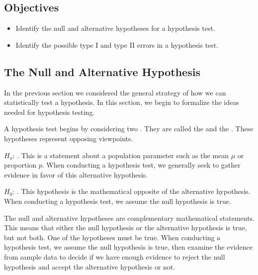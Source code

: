 \documentclass[letterpaper,10pt,english]{jupyterBook}
\begin{document}
\subsection{Objectives}
\label{\detokenize{Ch6 An Introduction to Hypothesis Testing/6.2 Hypotheses and Errors:objectives}}\begin{itemize}
\item {} 
\sphinxAtStartPar
Identify the null and alternative hypotheses for a hypothesis test.

\item {} 
\sphinxAtStartPar
Identify the possible type I and type II errors in a hypothesis test.

\end{itemize}


\subsection{The Null and Alternative Hypothesis}
\label{\detokenize{Ch6 An Introduction to Hypothesis Testing/6.2 Hypotheses and Errors:the-null-and-alternative-hypothesis}}
\sphinxAtStartPar
In the previous section we considered the general strategy of how we can statistically test a hypothesis. In this section, we begin to formalize the ideas needed for hypothesis testing.

\sphinxAtStartPar
A hypothesis test begins by considering two . They are called the  and the . These hypotheses represent opposing viewpoints.

\sphinxAtStartPar
\(H_a\): . This is a statement about a population parameter such as the mean \(\mu\) or proportion \(p\). When conducting a hypothesis test, we generally seek to gather evidence in favor of this alternative hypothesis.

\sphinxAtStartPar
\(H_0\): . This hypothesis is the mathematical opposite of the alternative hypothesis. When conducting a hypothesis test, we assume the null hypothesis is true.

\sphinxAtStartPar
The null and alternative hypotheses are complementary mathematical statements. This means that either the null hypothesis or the alternative hypothesis is true, but not both. One of the hypotheses must be true. When conducting a hypothesis test, we assume the null hypothesis is true, then examine the evidence from sample data to decide if we have enough evidence to reject the null hypothesis and accept the alternative hypothesis or not.
\end{document}
